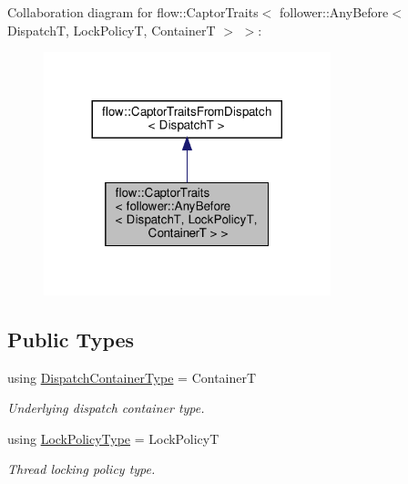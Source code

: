 Collaboration diagram for flow\+:\+:Captor\+Traits$<$ follower\+:\+:Any\+Before$<$ DispatchT, Lock\+PolicyT, ContainerT $>$ $>$\+:\nopagebreak
\begin{figure}[H]
\begin{center}
\leavevmode
\includegraphics[width=236pt]{structflow_1_1_captor_traits_3_01follower_1_1_any_before_3_01_dispatch_t_00_01_lock_policy_t_00_12a121811c469be4edfce04e073fee80}
\end{center}
\end{figure}
\subsection*{Public Types}
\begin{DoxyCompactItemize}
\item 
\mbox{\label{structflow_1_1_captor_traits_3_01follower_1_1_any_before_3_01_dispatch_t_00_01_lock_policy_t_00_01_container_t_01_4_01_4_ac09d19c0e44905029f3b570bbae450e1}} 
using \hyperlink{structflow_1_1_captor_traits_3_01follower_1_1_any_before_3_01_dispatch_t_00_01_lock_policy_t_00_01_container_t_01_4_01_4_ac09d19c0e44905029f3b570bbae450e1}{Dispatch\+Container\+Type} = ContainerT
\begin{DoxyCompactList}\small\item\em Underlying dispatch container type. \end{DoxyCompactList}\item 
\mbox{\label{structflow_1_1_captor_traits_3_01follower_1_1_any_before_3_01_dispatch_t_00_01_lock_policy_t_00_01_container_t_01_4_01_4_acae0a38175d848686c41a826e88d0c59}} 
using \hyperlink{structflow_1_1_captor_traits_3_01follower_1_1_any_before_3_01_dispatch_t_00_01_lock_policy_t_00_01_container_t_01_4_01_4_acae0a38175d848686c41a826e88d0c59}{Lock\+Policy\+Type} = Lock\+PolicyT
\begin{DoxyCompactList}\small\item\em Thread locking policy type. \end{DoxyCompactList}\end{DoxyCompactItemize}


